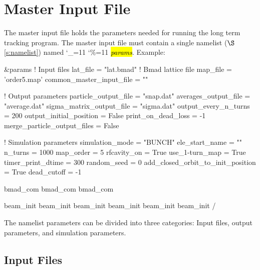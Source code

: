 \documentclass{hitec}
\newcommand\dottcmd[1]{\hl{\em#1}\endgroup}
\newcommand{\vn}{\begingroup\catcode`\_=11 \catcode`\%=11 \dottcmd}
\newcommand{\sref}[1]{$\S$\ref{#1}}
\newcommand{\Section}[1]{\section{#1}\vspace*{-1ex}}
\begin{document}
{{{{{{\newpage

\Section{Master Input File}
\label{s:input}

The master input file holds the parameters needed for running the long term tracking program. The
master input file must contain a single namelist (\sref{s:namelist}) named \vn{params}.  Example:
\begin{code}
&params
  ! Input files
  lat_file   =  "lat.bmad"     ! Bmad lattice file
  map_file = 'order5.map'
  common_master_input_file = ""

  ! Output parameters
  particle_output_file = "snap.dat"
  averages_output_file = "average.dat"  
  sigma_matrix_output_file = "sigma.dat"
  output_every_n_turns = 200
  output_initial_position = False
  print_on_dead_loss = -1
  merge_particle_output_files = False

  ! Simulation parameters
  simulation_mode = "BUNCH"
  ele_start_name     = ""
  n_turns            = 1000
  map_order          = 5
  rfcavity_on        = True
  use_1-turn_map     = True
  timer_print_dtime  = 300
  random_seed        = 0
  add_closed_orbit_to_init_position = True
  dead_cutoff = -1

  bmad_com%
  bmad_com%
  bmad_com%

  beam_init%
  beam_init%
  beam_init%
  beam_init%
  beam_init%
  beam_init%
/
\end{code}

\newpage

The namelist parameters can be divided into three categories: Input files, output parameters, and
simulation parameters.

\subsection{Input Files}

}}}}}}
\end{document}
